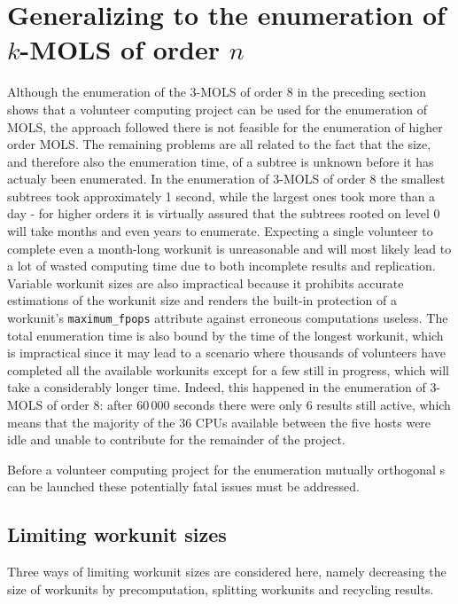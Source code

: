 \section{Generalizing to the enumeration of $k$-MOLS of order $n$}\label{5gen}
Although the enumeration of the 3-MOLS of order 8 in the preceding section shows that a volunteer computing project can be used for the enumeration of MOLS, the approach followed there is not feasible for the enumeration of higher order MOLS. 
The remaining problems are all related to the fact that the size, and therefore also the enumeration time, of a subtree is unknown before it has actualy been enumerated. In the enumeration of 3-MOLS of order 8 the smallest subtrees took approximately 1 second, while the largest ones took more than a day - for higher orders it is virtually assured that the subtrees rooted on level 0 will take months and even years to enumerate. Expecting a single volunteer to complete even a month-long workunit is unreasonable and will most likely lead to a lot of wasted computing time due to both incomplete results and replication. Variable workunit sizes are also impractical because it prohibits accurate estimations of the workunit size and renders the   built-in protection of a workunit's \verb|maximum_fpops| attribute against erroneous computations useless. The total enumeration time is also bound by the time of the longest workunit, which is impractical since it may lead to a scenario where thousands of volunteers have completed all the available workunits except for a few still in progress, which will take a considerably longer time. Indeed, this happened in the enumeration of 3-MOLS of order 8: after $60\,000$ seconds there were only 6 results still active, which means that the majority of the 36 CPUs available between the five hosts were idle and unable to contribute for the remainder of the project. 

Before a volunteer computing project for the enumeration mutually orthogonal \lat s can be launched these potentially fatal issues must be addressed.

\subsection{Limiting workunit sizes} \label{5gensizes}
Three ways of limiting workunit sizes  are considered here, namely  decreasing the size of workunits by precomputation, splitting workunits and recycling results.

